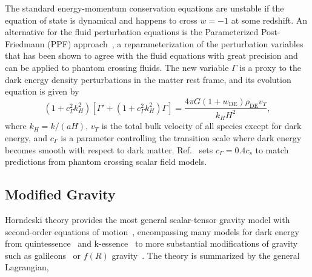 \documentclass[%
reprint,
superscriptaddress,
preprint numbers,
nofootinbib,
amsmath,amssymb,
aps,
prd
]{revtex4-2}
\begin{document}
The standard energy-momentum conservation equations are unstable if the equation of state is dynamical and happens to cross $w = -1$ at some redshift. An alternative for the fluid perturbation equations is the Parameterized Post-Friedmann (PPF) approach~\cite{ppf_phantom_crossing}, a reparameterization of the perturbation variables that has been shown to agree with the fluid equations with great precision and can be applied to phantom crossing fluids. The new variable $\Gamma$ is a proxy to the dark energy density perturbations in the matter rest frame, and its evolution equation is given by
\begin{equation}
    (1 + c_\Gamma^2 k_H^2)[\Gamma' + (1 + c_\Gamma^2 k_H^2)\Gamma] = \frac{4\pi G(1 + w_\mathrm{DE})\rho_\mathrm{DE}v_T}{k_HH^2},
\end{equation}
where $k_H = k/(aH)$, $v_T$ is the total bulk velocity of all species except for dark energy, and $c_\Gamma$ is a parameter controlling the transition scale where dark energy becomes smooth with respect to dark matter. Ref.~\cite{ppf_phantom_crossing} sets $c_\Gamma = 0.4c_s$ to match predictions from phantom crossing scalar field models.

\subsection{Modified Gravity}
\label{sec:cs2mg}

Horndeski theory provides the most general scalar-tensor gravity model with second-order equations of motion~\cite{horndeski}, encompassing many models for dark energy from quintessence~\cite{Frieman1995, Ratra1988, Caldwell1998} and k-essence~\cite{kessence} to more substantial modifications of gravity such as galileons~\cite{galileon, galileon_planck} or $f(R)$ gravity~\cite{buchdahl, hu_sawicki_fr}. The theory is summarized by the general Lagrangian,
\end{document}
